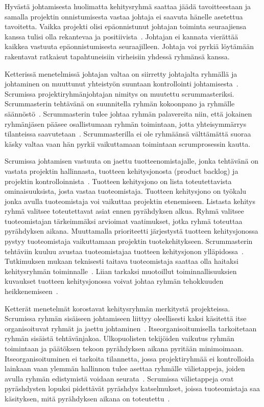 \documentclass[finnish]{tktltiki2}
\theoremstyle{definition}
\theoremstyle{remark}
\begin{document}
Hyvästä johtamisesta huolimatta kehitysryhmä saattaa jäädä tavoitteestaan ja samalla projektin onnistumisesta vastaa johtaja ei saavuta hänelle asetettua tavoitetta. Vaikka projekti olisi epäonnistunut johtajan toiminta seuraajiensa kanssa tulisi olla rekantevaa ja positiivista~\cite{raccoon2006leadership}. Johtajan ei kannata vierättää kaikkea vastuuta epäonnistumisesta seuraajilleen. Johtaja voi pyrkiä löytämään rakentavat ratkaisut tapahtuneisiin virheisiin yhdessä ryhmänsä kanssa. 

Ketterissä menetelmissä johtajan valtaa on siirretty johtajalta ryhmällä ja johtaminen on muuttunut yhteistyön suuntaan kontrollointi johtamisesta~\cite{Nerur:2005:CMA:1060710.1060712}. Scrumissa projektiryhmänjohtajan nimitys on muutettu scrummasteriksi. Scrummasterin tehtävänä on suunnitella ryhmän kokoonpano ja ryhmälle säännöstö~\cite{4755768}. Scrummasterin tulee johtaa ryhmän palavereita niin, että jokainen ryhmänjäsen pääsee osallistumaan ryhmän toimintaan, jotta yhteisymmärrys tilanteissa saavutetaan~\cite{bradley1997effect}. Scrummasterilla ei ole ryhmäänsä välttämättä suoraa käsky valtaa vaan hän pyrkii vaikuttamaan toimintaan scrumprosessin kautta.

Scrumissa johtamisen vastuuta on jaettu tuotteenomistajalle, jonka tehtävänä on vastata projektin hallinnasta, tuotteen kehitysjonosta (product backlog) ja projektin kontrolloinnista~\cite{4755768}. Tuotteen kehitysjono on lista toteutettavista ominaisuuksista, josta vastaa tuoteomistaja. Tuotteen kehitysjono on työkalu jonka avulla tuoteomistaja voi vaikuttaa projektin etenemiseen. Listasta kehitys ryhmä valitsee toteutettavat asiat ennen pyrähdyksen alkua. Ryhmä valitsee tuoteomistajan tärkeimmäksi arvioimat vaatimukset, jotka ryhmä toteuttaa pyrähdyksen aikana. Muuttamalla prioriteetti järjestystä tuotteen kehitysjonossa pystyy tuoteomistaja vaikuttamaan projektin tuotekehitykseen. Scrummasterin tehtäviin kuuluu avustaa tuoteomistajaa tuotteen kehitysjonon ylläpidossa~\cite{Nerur:2005:CMA:1060710.1060712}. Tutkimuksen mukaan teknisesti taitava tuoteomistaja saattaa olla haitaksi kehitysryhmän toiminnalle~\cite{Nerur:2005:CMA:1060710.1060712}. Liian tarkaksi muotoillut toiminnallisuuksien kuvaukset tuotteen kehitysjonossa voivat johtaa ryhmän tehokkuuden heikkenemiseen~\cite{Nerur:2005:CMA:1060710.1060712}.

Ketterät menetelmät korostavat kehitysryhmän merkitystä projekteissa. Scrumissa ryhmän sisäiseen johtamiseen liittyy oleellisesti kaksi käsitettä itse organisoituvat ryhmät ja jaettu johtaminen~\cite{4755768}. Itseorganisoitumisella tarkoitetaan ryhmän sisäistä tehtävänjakoa. Ulkopuolisten tekijöiden vaikutus ryhmän toimintaan ja päätöksen tekoon pyrähdyksen aikana pyritään minimoimaan. Itseorganisoituminen ei tarkoita tilannetta, jossa projektiryhmää ei kontrolloida lainkaan vaan ylemmän hallinnon tulee asettaa ryhmälle välietappeja, joiden avulla ryhmän edistymistä voidaan seurata~\cite{Nerur:2005:CMA:1060710.1060712}. Scrumissa välietappeja ovat pyräshdysten lopuksi pidettävät pyräshdys katselmukset, joissa tuoteomistaja saa käsityksen, mitä pyrähdyksen aikana on toteutettu~\cite{schwaber1995scrum}.
\end{document}
